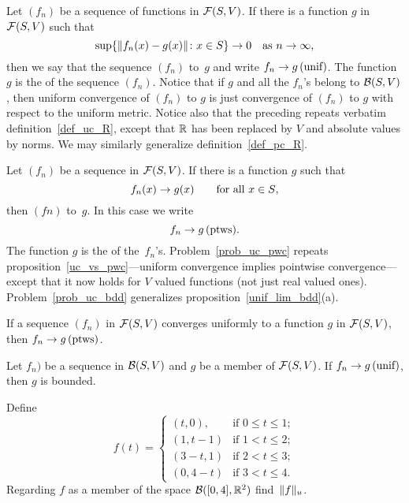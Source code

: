 \begin{defn}  Let $(f_n)$ be a sequence of functions in $\mathcal{F}(S,V)$.  If there is a function
$g$ in $\mathcal{F}(S,V)$ such that
  \[ \sup\{\lVert f_n(x) - g(x)\rVert\colon x \in S\} \rightarrow 0 \quad \text{as $n \rightarrow \infty$,} \]
then we say that the sequence $(f_n)$
 to~$g$ and write $f_n \rightarrow g \text{\,(unif)}$.  The function $g$ is
the
 of the sequence $(f_n)$.  Notice that if $g$ and all the $f_n$'s belong to
$\mathcal{B}(S,V)$, then uniform convergence of $(f_n)$ to $g$ is just convergence of $(f_n)$ to
$g$ with respect to the uniform metric.  Notice also that the preceding repeats verbatim
definition~\ref{def_uc_R}, except that $\mathbb{R}$ has been replaced by $V$ and absolute values by
norms.  We may similarly generalize definition~\ref{def_pc_R}.
\end{defn}

\begin{defn}  Let $(f_n)$ be a sequence in $\mathcal{F}(S,V)$.  If there is a function $g$ such that
  \[ f_n(x) \rightarrow g(x) \qquad  \text{for all $x \in S$}, \]
then $(fn)$
 to~$g$.  In this case we write
  \[ f_n \rightarrow g \text{\,(ptws)}. \]
The function $g$ is the
 of the~$f_n$'s.  Problem~\ref{prob_uc_pwc} repeats
proposition~\ref{uc_vs_pwc}---uniform convergence implies pointwise convergence---except that
it now holds for $V$ valued functions (not just real valued ones).  Problem~\ref{prob_uc_bdd}
generalizes proposition~\ref{unif_lim_bdd}(a).
\end{defn}

\begin{prob}\label{prob_uc_pwc} If a sequence $(f_n)$ in $\mathcal{F}(S,V)$ converges uniformly to
a function $g$ in $\mathcal{F}(S,V)$, then $f_n \rightarrow g \text{\,(ptws)}$.
\end{prob}

\begin{prob}\label{prob_uc_bdd} Let $f_n)$ be a sequence in $\mathcal{B}(S,V)$ and $g$ be a member
of $\mathcal{F}(S,V)$.  If $f_n \rightarrow g\text{\,(unif)}$, then $g$ is bounded.
\end{prob}

\begin{prob} Define
 \begin{equation*}
    f(t) =
      \begin{cases}
             (t,0),    &\text{if $0 \le t \le 1$};   \\
             (1,t-1)   &\text{if $1 < t \le 2$};     \\
             (3-t,1)   &\text{if $2 < t \le 3$};     \\
             (0,4-t)   &\text{if $3 < t \le 4$}.
      \end{cases}
 \end{equation*}
Regarding $f$ as a member of the space $\mathcal{B}([0,4],\mathbb{R}^2)$ find~$\lVert f\rVert_u$.
\end{prob}

